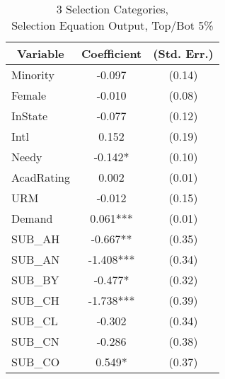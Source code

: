 \clearpage{}

\newpage{}

\begin{table}[H]\centering
  \begin{threeparttable}
    \caption{3 Selection Categories, \\Selection Equation Output, Top/Bot 5\%}\label{table:b8}
    \begin{tabular}{l c c}
      \hline\hline 
      \multicolumn{1}{c}{\textbf{Variable}} & {\textbf{Coefficient}} & \textbf{(Std. Err.)} \\ 
      \hline
      \hline 
      Minority                              & -0.097                 & (0.14)               \\
      Female                                & -0.010                 & (0.08)               \\
      InState                                    & -0.077                 & (0.12)               \\
      Intl                                  & 0.152                  & (0.19)               \\
      Needy                                 & -0.142*                & (0.10)               \\
      AcadRating                            & 0.002                  & (0.01)               \\
      URM                                   & -0.012                 & (0.15)               \\
      Demand                                & 0.061***               & (0.01)               \\
      SUB\_AH                               & -0.667**               & (0.35)               \\
      SUB\_AN                               & -1.408***              & (0.34)               \\
      SUB\_BY                               & -0.477*                & (0.32)               \\
      SUB\_CH                               & -1.738***              & (0.39)               \\
      SUB\_CL                               & -0.302                 & (0.34)               \\
      SUB\_CN                               & -0.286                 & (0.38)               \\
      SUB\_CO                               & 0.549*                 & (0.37)               \\

\end{tabular}
\end{threeparttable}
\end{table}
